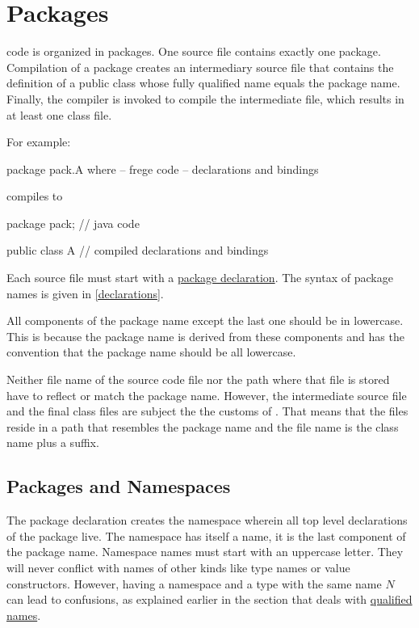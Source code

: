 

\chapter{Packages} \label{packages} 

\frege{} code is organized in packages. One source file contains
exactly one package. Compilation of a package creates an  intermediary \java{}
source file that contains the definition of a public class whose fully qualified name equals the \frege{} package name. Finally, the \java{} compiler is invoked to compile the intermediate file, which results in at least one class file.

For example:

\begin{code}
package pack.A where  -- frege code
-- declarations and bindings
\end{code}

compiles to

\begin{code}
package pack;        // java code

public class A {
    // compiled declarations and bindings
}
\end{code}


Each source file must start with a \hyperref[packagedcl]{package declaration}.
The syntax of package names is given in \autoref{declarations}.

All components of the package name
except the last one should be in lowercase. This is because the \java{}
package name is derived from these components and \java{} has the
convention that the package name should be all lowercase.

Neither file name of the \frege{} source code file nor the path where that file is stored have to reflect or match the package name. However, the intermediate \java{} source file and the final class files are subject the the customs of \java{}. That means that the files reside in a path that resembles the package name and the file name is the class name plus a suffix.

\section{Packages and Namespaces}

The package declaration creates the namespace wherein all top level declarations 
of the package live. The namespace has itself a name,
it is the last component of the package name. Namespace names must start
with an uppercase letter. They will never conflict with names of other
kinds like type names or value constructors. 
However, having a namespace and a type with the same name $N$ can lead to confusions, as explained earlier in the section that deals with \hyperref[qualified names]{qualified names}.

